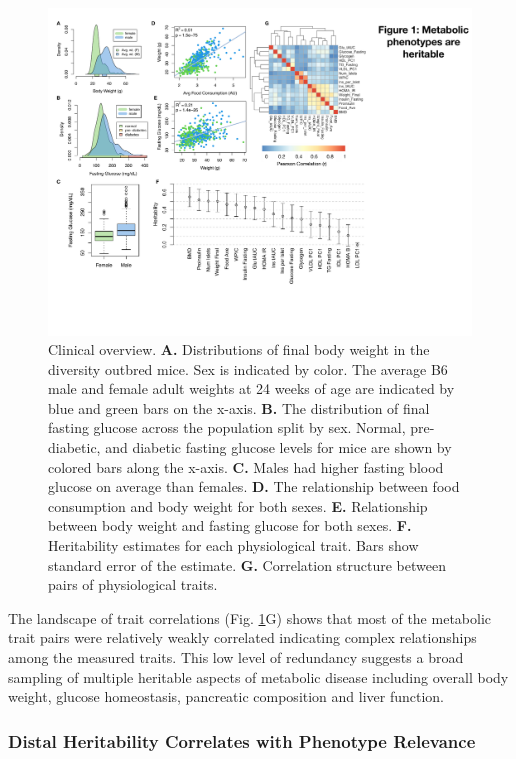 \documentclass[
]{article}
\begin{document}
\begin{figure}[ht!]
\includegraphics[width=\textwidth]{Figures/Fig1_trait_overview.pdf} 
\caption{Clinical overview. \textbf{A.} Distributions of final body weight 
in the diversity outbred mice. Sex is indicated by color. The 
average B6 male and female adult weights at 24 weeks of age 
are indicated by blue and green bars on the x-axis. \textbf{B.} The 
distribution of final fasting glucose across the population split 
by sex. Normal, pre-diabetic, and diabetic fasting glucose levels 
for mice are shown by colored bars along the x-axis. \textbf{C.} Males had 
higher fasting blood glucose on average than females. \textbf{D.} The 
relationship between food consumption and body weight for both 
sexes. \textbf{E.} Relationship between body weight and fasting glucose 
for both sexes. \textbf{F.} Heritability estimates for each physiological 
trait. Bars show standard error of the estimate. \textbf{G.} Correlation 
structure between pairs of physiological traits.}
\label{fig:trait_overview}
\end{figure}

The landscape of trait correlations (Fig. \ref{fig:trait_overview}G)
shows that most of the metabolic trait pairs were relatively weakly
correlated indicating complex relationships among the measured traits.
This low level of redundancy suggests a broad sampling of multiple
heritable aspects of metabolic disease including overall body weight,
glucose homeostasis, pancreatic composition and liver function.

\subsubsection{Distal Heritability Correlates with Phenotype
Relevance}\label{distal-heritability-correlates-with-phenotype-relevance}
\end{document}
